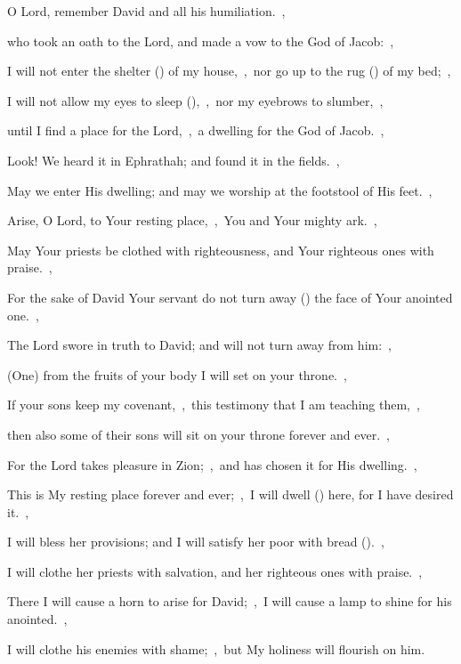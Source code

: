 \documentclass[12pt,twoside,a5paper]{article}
\begin{document}
\begin{normalparskip}
  O Lord, remember David and all his humiliation.~\sep

  who took an oath to the Lord, and made a vow to the God of Jacob:~\sep


  I will not enter the shelter () of my house,~\sep\ nor go up to the rug () of my bed;~\sep

  I will not allow my eyes to sleep (),~\sep\ nor my eyebrows to slumber,~\sep

  until I find a place for the Lord,~\sep\ a dwelling for the God of Jacob.~\sep

  Look! We heard it in Ephrathah; and found it in the fields.~\sep

  May we enter His dwelling; and may we worship at the footstool of His feet.~\sep

  Arise, O Lord, to Your resting place,~\sep\ You and Your mighty ark.~\sep

  May Your priests be clothed with righteousness, and Your righteous ones with praise.~\sep

  For the sake of David Your servant do not turn away () the face of Your anointed one.~\sep

  The Lord swore in truth to David; and will not turn away from him:~\sep

  (One) from the fruits of your body I will set on your throne.~\sep

  If your sons keep my covenant,~\sep\ this testimony that I am teaching them,~\sep

  then also some of their sons will sit on your throne forever and ever.~\sep

  For the Lord takes pleasure in Zion;~\sep\ and has chosen it for His dwelling.~\sep

  This is My resting place forever and ever;~\sep\ I will dwell () here, for I have desired it.~\sep

  I will bless her provisions; and I will satisfy her poor with bread ().~\sep

  I will clothe her priests with salvation, and her righteous ones with praise.~\sep

  There I will cause a horn to arise for David;~\sep\ I will cause a lamp to shine for his anointed.~\sep

  I will clothe his enemies with shame;~\sep\ but My holiness will flourish on him.
\end{normalparskip}
\end{document}
